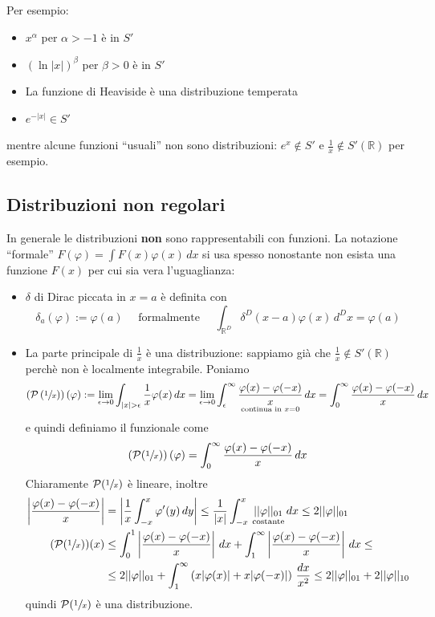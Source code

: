 \documentclass[11pt,a4paper,twoside]{book}
\theoremstyle{esss}
\theoremstyle{dotless}
\numberwithin{equation}{section} %
\begin{document}
Per esempio:\begin{itemize}[label=$\cdot$]
\item $x^\alpha$ per $\alpha>-1$ è in $S'$
\item $\left(\ln{|x|}\right)^\beta$ per $\beta>0$ è in $S'$
\item La funzione di Heaviside è una distribuzione temperata
\item $e^{-|x|}\in S'$
\end{itemize}
mentre alcune funzioni ``usuali'' non sono distribuzioni: $e^x\not\in S'$ e $\frac{1}{x}\not\in S'(\mathbb{R})$ per esempio.


\subsection{Distribuzioni non regolari}

In generale le distribuzioni \textbf{non} sono rappresentabili con funzioni. La notazione ``formale'' $F(\varphi)=\int F(x)\varphi(x)\,dx$ si usa spesso nonostante non esista una funzione $F(x)$ per cui sia vera l'uguaglianza:\begin{itemize}[label=$\cdot$]
\item $\delta$ di Dirac piccata in $x=a$ è definita con
\begin{equation}
\delta_a (\varphi):= \varphi(a) \quad \text{ formalmente } \quad \int_{\mathbb{R}^D} \delta^D(x-a) \varphi(x)\,d^Dx=\varphi(a)
\end{equation}
\item La parte principale di $\frac{1}{x}$ è una distribuzione: sappiamo già che $\frac{1}{x}\not\in S'(\mathbb{R})$ perchè non è localmente integrabile. Poniamo
\[
\left(\mathcal{P}\left(\sfrac{1}{x}\right)\right)(\varphi):=\lim_{\epsilon\rightarrow0}\int_{|x|>\epsilon}\dfrac{1}{x}\varphi(x)\,dx = \lim_{\epsilon\rightarrow0} \int_\epsilon^\infty \underset{\text{continua in }x=0}{\dfrac{\varphi(x)-\varphi(-x)}{x}}\,dx = \int_0^\infty \dfrac{\varphi(x)-\varphi(-x)}{x}\,dx
\]
e quindi definiamo il funzionale come
\begin{equation}
\left(\mathcal{P}(\sfrac{1}{x})\right)(\varphi)=\int_0^\infty \dfrac{\varphi(x)-\varphi(-x)}{x}\,dx
\end{equation}
Chiaramente $\mathcal{P}(\sfrac{1}{x})$ è lineare, inoltre
\begin{align*}
\left|\dfrac{\varphi(x)-\varphi(-x)}{x}\right|&=\left|\frac{1}{x}\int_{-x}^x \varphi'(y)\,dy \right| \leq \frac{1}{|x|}\int_{-x}^x \, \underset{\text{costante}}{||\varphi||_{01}}\,dx \leq 2 ||\varphi||_{01}\\
(\mathcal{P}(\sfrac{1}{x}))(x)&\leq \int_0^1 \left|\dfrac{\varphi(x)-\varphi(-x)}{x}\right|\,dx + \int_1^\infty \left|\dfrac{\varphi(x)-\varphi(-x)}{x}\right|\,dx\leq \\ &\leq 2||\varphi||_{01} + \int_1^\infty \left(x|\varphi(x)|+x|\varphi(-x)|\right)\,\dfrac{dx}{x^2}\leq 2||\varphi||_{01}+2||\varphi||_{10}
\end{align*}
quindi $\mathcal{P}(\sfrac{1}{x})$ è una distribuzione.
\end{itemize}
\end{document}
